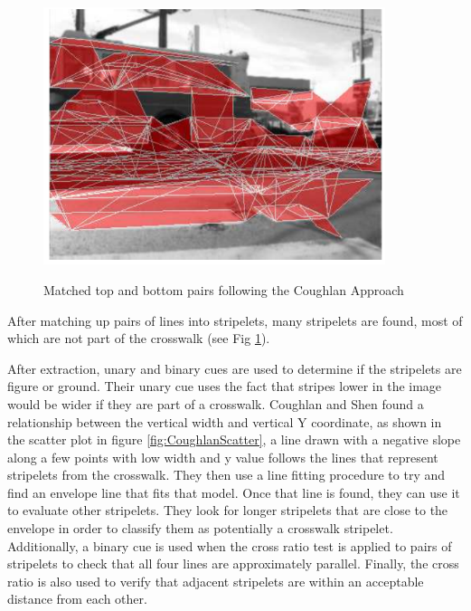 \documentclass[12pt]{ucthesis}
\newcommand{\captionfonts}{\small\bf\ssp}
\begin{document}
\begin{figure}[h!]
\begin{center}
\includegraphics[width=10cm]{CoughlanStriplets.png}
\captionfonts
\caption[Coughlan Approach Stripelets]{Matched top and bottom pairs following the Coughlan Approach \cite{Coughlan2006}}
\label{fig:CoughlanStriplets}
\end{center}
\end{figure}

After matching up pairs of lines into stripelets, many stripelets are found, most of which are not part of the crosswalk (see Fig \ref{fig:CoughlanStriplets}).

After extraction, unary and binary cues are used to determine if the stripelets are figure or ground. Their unary cue uses the fact that stripes lower in the image would be wider if they are part of a crosswalk. Coughlan and Shen found a relationship between the vertical width and vertical Y coordinate, as shown in the scatter plot in figure \ref{fig:CoughlanScatter}, a line drawn with a negative slope along a few points with low width and y value follows the lines that represent stripelets from the crosswalk. They then use a line fitting procedure to try and find an envelope line that fits that model. Once that line is found, they can use it to evaluate other stripelets. They look for longer stripelets that are close to the envelope in order to classify them as potentially a crosswalk stripelet. Additionally, a binary cue is used when the cross ratio test is applied to pairs of stripelets to check that all four lines are approximately parallel. Finally, the cross ratio is also used to verify that adjacent stripelets are within an acceptable distance from each other. 
\end{document}
